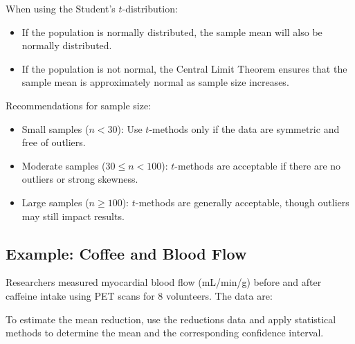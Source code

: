\documentclass{article}
\begin{document}
When using the Student's \(t\)-distribution:
\begin{itemize}
    \item If the population is normally distributed, the sample mean will also be normally distributed.
    \item If the population is not normal, the Central Limit Theorem ensures that the sample mean is approximately normal as sample size increases.
\end{itemize}

Recommendations for sample size:
\begin{itemize}
    \item Small samples (\(n < 30\)): Use \(t\)-methods only if the data are symmetric and free of outliers.
    \item Moderate samples (\(30 \leq n < 100\)): \(t\)-methods are acceptable if there are no outliers or strong skewness.
    \item Large samples (\(n \geq 100\)): \(t\)-methods are generally acceptable, though outliers may still impact results.
\end{itemize}

\subsection*{Example: Coffee and Blood Flow}

Researchers measured myocardial blood flow (mL/min/g) before and after caffeine intake using PET scans for 8 volunteers. The data are:


To estimate the mean reduction, use the reductions data and apply statistical methods to determine the mean and the corresponding confidence interval.
\end{document}
